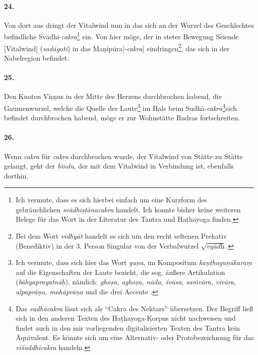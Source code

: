 \documentclass[a4paper,12pt]{article}
\begin{document}
\paragraph{24.} Von dort aus dringt der Vitalwind nun in das sich an der Wurzel des Geschlechtes befindliche Svādhi-\textit{cakra}\footnote{Ich vermute, dass es sich hierbei einfach um eine Kurzform des gebräuchlichen \textit{svādhiṣṭānacakra} handelt. Ich konnte bisher keine weiteren Belege für das Wort in der Literatur des Tantra und Haṭhayoga finden.} ein. Von hier möge, der in steter Bewegung Seiende [Vitalwind] (\textit{sadāgati}) in das Maṇipūra[-\textit{cakra}] eindringen\footnote{Bei dem Wort \textit{vidhyāt} handelt es sich um den recht seltenen Prekativ (Benediktiv) in der 3. Person Singular von der Verbalwurzel $\sqrt{\textit{vyādh}}$.}, das sich in der Nabelregion befindet.

\paragraph{25.} Den Knoten Viṣṇus in der Mitte des Herzens durchbrochen habend, die Gaumenwurzel, welche die Quelle der Laute\footnote{Ich vermute, dass sich hier das Wort \textit{guṇa}, im Kompositum \textit{kaṇṭhaguṇākaraṃ} auf die Eigenschaften der Laute bezieht, die sog. äußere Artikulation (\textit{bāhyaprayatnāḥ}), nämlich: \textit{ghoṣa, aghoṣa, nāda, śvāsa, saṁvāra, vivāra, alpaprāṇa, mahāprāṇa} und die drei Accente \parencite[756]{petersburger}.} im Hals beim Sudhā-\textit{cakra}\footnote{Das \textit{sudhācakra} lässt sich als ``Cakra des Nektars'' übersetzen. Der Begriff ließ sich in den anderen Texten des Haṭhayoga-Korpus nicht nachweisen und findet auch in den mir vorliegenden digitalisierten Texten des Tantra kein Äquivalent. Es könnte sich um eine Alternativ- oder Protobezeichnung für das \textit{viśuddhicakra} handeln.}sich befindet durchbrochen habend, möge er zur Wohnstätte Rudras fortschreiten. 

\paragraph{26.} Wenn \textit{cakra} für \textit{cakra} durchbrochen wurde, der Vitalwind von Stätte zu Stätte gelangt, geht der \textit{bindu}, der mit dem Vitalwind in Verbindung ist, ebenfalls dorthin.

\end{document}
